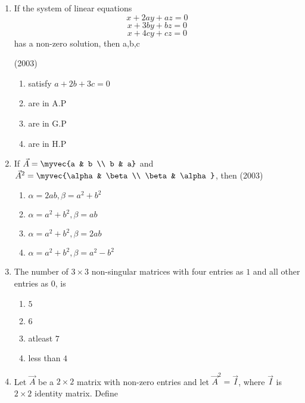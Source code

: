 \begin{enumerate}[label=\thesubsection.\arabic*.,ref=\thesubsection.\theenumi]
\item
	If the system of linear equations $$x+2ay+az = 0$$ $$x+3by+bz = 0$$ $$x+4cy+cz = 0$$ has a non-zero solution, then a,b,c

	\hfill (2003)

\begin{multicols}{2}
	\begin{enumerate}
                \item satisfy $a+ 2b+3c = 0$
                \item are in A.P
                \item are in G.P
                \item are in H.P
        \end{enumerate} 	
\end{multicols}
%
\item
        If $\vec{A}=\myvec{a & b \\ b & a}$ and $\vec{A}^{2}=\myvec{\alpha & \beta \\ \beta & \alpha}$, then 
	\hfill (2003)
\begin{multicols}{2}
        \begin{enumerate}
		\item $\alpha=2ab, \beta=a^{2}+b^{2}$
                \item $\alpha=a^{2}+b^{2}, \beta=ab$
                \item $\alpha=a^{2}+b^{2}, \beta=2ab$
                \item $\alpha=a^{2}+b^{2}, \beta=a^{2}-b^{2}$
        \end{enumerate}
\end{multicols}
%
			\newcommand{\adj}[1]{\text{adj}\brak{#1}}
%
    \item The number of $3\times3$ non-singular matrices with four entries as $1$ and all other entries as $0$, is 
	\hfill{}
%
\begin{multicols}{4}
	\begin{enumerate}
                \item $5$ 
		\item $6$
		\item atleast $7$
		\item less than $4$ 
	\end{enumerate}
\end{multicols}
    \item Let $\vec{A}$ be a $2\times2$ matrix with non-zero entries and let $\vec{A}^2 = \vec{I}$, where $\vec{I}$ is $2\times2$ identity matrix. Define 

\end{enumerate}

